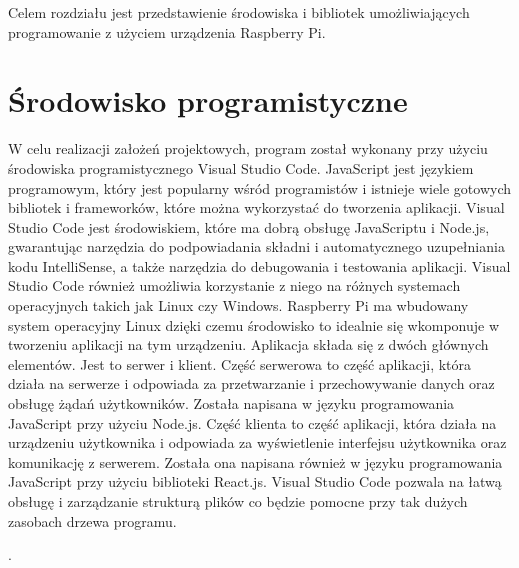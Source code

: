 Celem rozdziału jest przedstawienie środowiska i bibliotek umożliwiających programowanie z użyciem urządzenia Raspberry Pi.

\section{Środowisko programistyczne}
W celu realizacji założeń projektowych, program został wykonany przy użyciu środowiska programistycznego Visual Studio Code. JavaScript jest językiem programowym, który jest popularny wśród programistów i istnieje wiele gotowych bibliotek i frameworków, które można wykorzystać do tworzenia aplikacji. Visual Studio Code jest środowiskiem, które ma dobrą obsługę JavaScriptu i Node.js, gwarantując narzędzia do podpowiadania składni i automatycznego uzupełniania kodu IntelliSense, a także narzędzia do debugowania i testowania aplikacji. Visual Studio Code również umożliwia korzystanie z niego na różnych systemach operacyjnych takich jak Linux czy Windows. Raspberry Pi ma wbudowany system operacyjny Linux dzięki czemu środowisko to idealnie się wkomponuje w tworzeniu aplikacji na tym urządzeniu. Aplikacja składa się z dwóch głównych elementów. Jest to serwer i klient. Część serwerowa to część aplikacji, która działa na serwerze i odpowiada za przetwarzanie i przechowywanie danych oraz obsługę żądań użytkowników. Została napisana w języku programowania JavaScript przy użyciu Node.js. Część klienta to część aplikacji, która działa na urządzeniu użytkownika i odpowiada za wyświetlenie interfejsu użytkownika oraz komunikację z serwerem. Została ona napisana również w języku programowania JavaScript przy użyciu biblioteki React.js. Visual Studio Code pozwala na łatwą obsługę i zarządzanie strukturą plików co będzie pomocne przy tak dużych zasobach drzewa programu.

.

